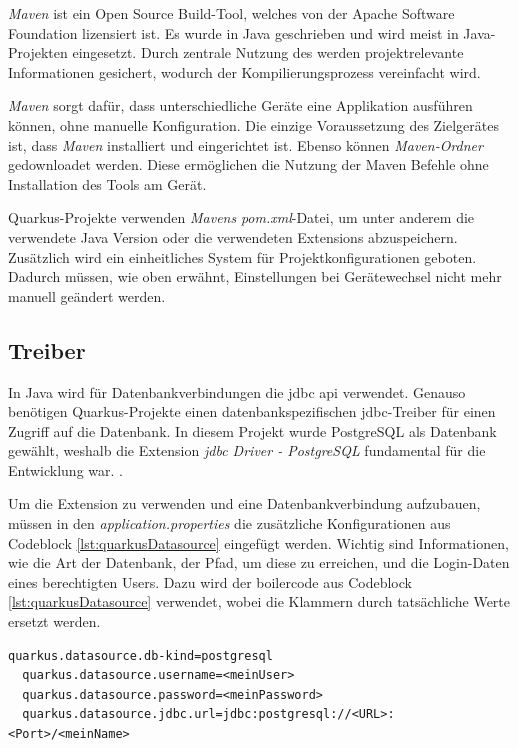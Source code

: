\emph{Maven} ist ein Open Source Build-Tool, welches von der Apache Software Foundation lizensiert ist.
Es wurde in Java geschrieben und wird meist in Java-Projekten eingesetzt. 
Durch zentrale Nutzung des  werden projektrelevante Informationen gesichert, wodurch der Kompilierungsprozess vereinfacht wird.
\cite{MavenAbout, MavenAbout2gls}

\emph{Maven} sorgt dafür, dass unterschiedliche Geräte eine Applikation ausführen können, ohne manuelle Konfiguration. 
Die einzige Voraussetzung  des Zielgerätes ist, dass \emph{Maven} installiert und eingerichtet ist. 
Ebenso können \emph{Maven-Ordner} gedownloadet werden. 
Diese ermöglichen die Nutzung der Maven Befehle ohne Installation des Tools am Gerät.
\cite{MavenAbout, MavenAbout2gls}

Quarkus-Projekte verwenden \emph{Mavens} \emph{pom.xml}-Datei, um unter anderem die verwendete Java Version oder die verwendeten Extensions abzuspeichern.
Zusätzlich wird ein einheitliches System für Projektkonfigurationen geboten. 
Dadurch müssen, wie oben erwähnt, Einstellungen bei Gerätewechsel nicht mehr manuell geändert werden. 
\cite{MavenAbout}

\subsection{ Treiber}
\label{ch::jdbctreiber}
In Java wird für Datenbankverbindungen die \gls{jdbc} \gls{api} verwendet. 
Genauso benötigen Quarkus-Projekte einen datenbankspezifischen \gls{jdbc}-Treiber für einen Zugriff auf die Datenbank. 
In diesem Projekt wurde PostgreSQL als Datenbank gewählt, weshalb die Extension \emph{\gls{jdbc} Driver - PostgreSQL} fundamental für die Entwicklung war. 
\cite{datasourcesAbout}.

Um die Extension zu verwenden und eine Datenbankverbindung aufzubauen, müssen in den \emph{application.properties} die zusätzliche Konfigurationen aus Codeblock \ref{lst:quarkusDatasource} eingefügt werden. 
Wichtig sind Informationen, wie die Art der Datenbank, der Pfad, um diese zu erreichen, und die Login-Daten eines berechtigten Users.
Dazu wird der \gls{boilercode} aus Codeblock \ref{lst:quarkusDatasource} verwendet, wobei die Klammern durch tatsächliche Werte ersetzt werden. 
\cite{datasourcesAbout}

\begin{lstlisting}[caption=Beispielkonfigurationen,label=lst:quarkusDatasource]
  quarkus.datasource.db-kind=postgresql 
  quarkus.datasource.username=<meinUser>
  quarkus.datasource.password=<meinPassword>
  quarkus.datasource.jdbc.url=jdbc:postgresql://<URL>:<Port>/<meinName>
\end{lstlisting}

